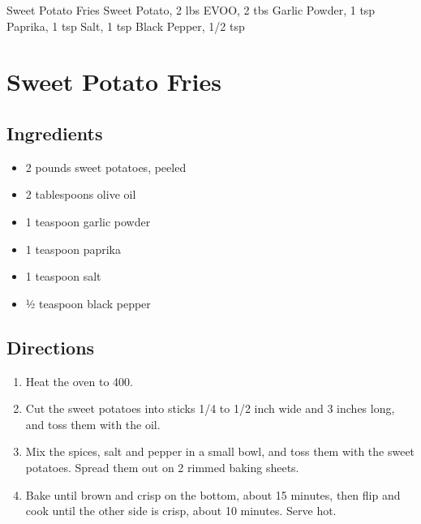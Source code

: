 Sweet Potato Fries
  Sweet Potato, 2 lbs
  EVOO, 2 tbs
  Garlic Powder, 1 tsp
  Paprika, 1 tsp
  Salt, 1 tsp
  Black Pepper, 1/2 tsp

\section{ Sweet Potato Fries }

\subsection{ Ingredients }

\begin{itemize}
  \item 2 pounds sweet potatoes, peeled
  \item 2 tablespoons olive oil
  \item 1 teaspoon garlic powder
  \item 1 teaspoon paprika
  \item 1 teaspoon salt
  \item ½ teaspoon black pepper
\end{itemize}

\subsection{ Directions }

\begin{enumerate}
  \item Heat the oven to 400.
  \item Cut the sweet potatoes into sticks 1/4 to 1/2 inch wide and 3 inches long, and toss them with the oil.
  \item Mix the spices, salt and pepper in a small bowl, and toss them with the sweet potatoes. Spread them out on 2 rimmed baking sheets.
  \item Bake until brown and crisp on the bottom, about 15 minutes, then flip and cook until the other side is crisp, about 10 minutes. Serve hot.
\end{enumerate}
